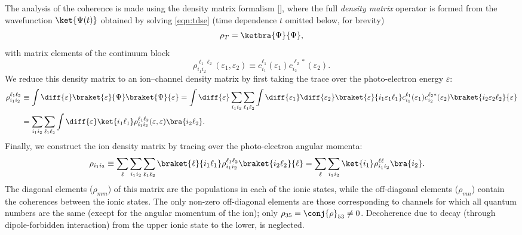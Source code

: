 The analysis of the coherence is made using the density matrix
formalism [\cite[§14]{Landau1977quant}], where the full \emph{density
  matrix} operator is formed from the wavefunction \(\ket{\Psi(t)}\)
obtained by solving \eqref{eqn:tdse} (time dependence \(t\) omitted
below, for brevity)
\begin{equation}
  \label{eqn:density-matrix-operator}
  \rho_T = \ketbra{\Psi}{\Psi},
\end{equation}
with matrix elements of the continuum block
\begin{equation}
  \label{eqn:continuum-densities}
  \rho_{i_1i_2}^{\ell_1\ell_2}(\varepsilon_1,\varepsilon_2) \equiv
  c_{i_1}^{\ell_1}(\varepsilon_1)
  c_{i_2}^{\ell_2*}(\varepsilon_2).
\end{equation}
We reduce this density matrix to an
ion--channel density matrix by first taking the trace over the
photo-electron energy \(\varepsilon\):
\begin{equation}
  \label{eqn:ion-channel-density-matrix}
  \begin{aligned}
    \rho_{i_1i_2}^{\ell_1\ell_2}&\equiv
    \int\diff{\varepsilon}
    \braket{\varepsilon}{\Psi}\braket{\Psi}{\varepsilon}
    =\int\diff{\varepsilon}
    \sum_{i_1i_2}\sum_{\ell_1\ell_2}
    \int\diff{\varepsilon_1}\diff{\varepsilon_2}
    \braket{\varepsilon}{i_1\varepsilon_1\ell_1}
    c_{i_1}^{\ell_1}(\varepsilon_1)c_{i_2}^{\ell_2*}(\varepsilon_2)
    \braket{i_2\varepsilon_2\ell_2}{\varepsilon}\\
    &=
    \sum_{i_1i_2}\sum_{\ell_1\ell_2}
    \int\diff{\varepsilon}
    \ket{i_1\ell_1}
    \rho_{i_1i_2}^{\ell_1\ell_2}(\varepsilon,\varepsilon)
    \bra{i_2\ell_2}.
  \end{aligned}
\end{equation}
Finally, we construct the ion density matrix by tracing over the
photo-electron angular momenta:
\begin{equation}
  \label{eqn:ion-density-matrix}
  \begin{aligned}
    \rho_{i_1i_2}&\equiv
    \sum_\ell
    \sum_{i_1i_2}\sum_{\ell_1\ell_2}
    \braket{\ell}{i_1\ell_1}
    \rho_{i_1i_2}^{\ell_1\ell_2}
    \braket{i_2\ell_2}{\ell}
    =
    \sum_\ell
    \sum_{i_1i_2}
    \ket{i_1}
    \rho_{i_1i_2}^{\ell\ell}
    \bra{i_2}.
  \end{aligned}
\end{equation}
The diagonal elements (\(\rho_{mm}\)) of this matrix are the populations
in each of the ionic states, while the off-diagonal elements
(\(\rho_{mn}\)) contain the coherences between the ionic states. The only
non-zero off-diagonal elements are those corresponding to channels for
which all quantum numbers are the same (except for the angular
momentum of the ion); \ie only \(\rho_{35} = \conj{\rho}_{53}\neq0\).
Decoherence due to decay (through dipole-forbidden interaction) from
the upper ionic state to the lower, is neglected.